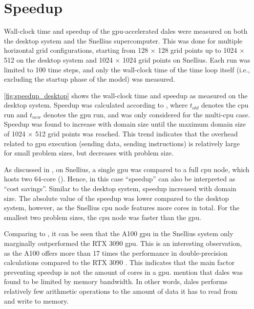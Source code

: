 \section{Speedup} \label{sec:speedup}
Wall-clock time and speedup of the \acrshort{gpu}-accelerated \acrshort{dales} were measured on both the desktop system and the Snellius supercomputer. This was done for multiple horizontal grid configurations, starting from 128 $\times$ 128 grid points up to 1024 $\times$ 512 on the desktop system and 1024 $\times$ 1024 grid points on Snellius. Each run was limited to 100 time steps, and only the wall-clock time of the time loop itself (i.e., excluding the startup phase of the model) was measured.

\autoref{fig:speedup_desktop} shows the wall-clock time and speedup as measured on the desktop system. Speedup was calculated according to , where $t_{old}$ denotes the \acrshort{cpu} run and $t_{new}$ denotes the \acrshort{gpu} run, and was only considered for the multi-\acrshort{cpu} case. Speedup was found to increase with domain size until the maximum domain size of 1024 $\times$ 512 grid points was reached. This trend indicates that the overhead related to \acrshort{gpu} execution (sending data, sending instructions) is relatively large for small problem sizes, but decreases with problem size.

As discussed in , on Snellius, a single \acrshort{gpu} was compared to a full \acrshort{cpu} node, which hosts two 64-core  (). Hence, in this case ``speedup'' can also be interpreted as ``cost savings''. Similar to the desktop system, speedup increased with domain size. The absolute value of the speedup was lower compared to the desktop system, however, as the Snellius \acrshort{cpu} node features more cores in total. For the smallest two problem sizes, the \acrshort{cpu} node was faster than the \acrshort{gpu}.

Comparing  to , it can be seen that the A100 \acrshort{gpu} in the Snellius system only marginally outperformed the RTX 3090 \acrshort{gpu}. This is an interesting observation, as the A100 offers more than 17 times the performance in double-precision calculations compared to the RTX 3090 \citep{nvidiaNVIDIAA100Tensor2020,nvidiaNVIDIAAmpereGA1022021}. This indicates that the main factor preventing speedup is not the amount of cores in a \acrshort{gpu}. \citet{janssonCloudBotanyShallow2023} mention that \acrshort{dales} was found to be limited by memory bandwidth. In other words, \acrshort{dales} performs relatively few arithmetic operations to the amount of data it has to read from and write to memory. 

